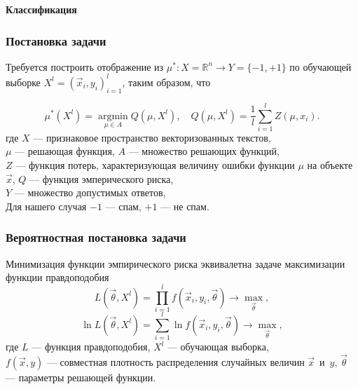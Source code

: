 \documentclass[compress,professionalfont]{beamer}
\begin{document}
\begin{frame}

\begin{center}
\Huge\bf Классификация
\end{center}

\end{frame}

\begin{frame}
\frametitle{Постановка задачи}

Требуется построить отображение из $\mu^{*} : X =  \mathbb{R}^n \rightarrow Y = \{-1,+1\}$ по обучающей выборке $X^l = (\vec{x}_i, y_i)_{i=1}^l$, таким образом, что

$$
\mu^{*}\left(X^l\right) = \operatorname*{argmin}_{\mu \in A}  Q\left(\mu, X^l\right), \quad Q\left(\mu, X^l\right) = \dfrac{1}{l} \sum_{i=1}^{l} Z(\mu, x_i).
$$
где $X$ --- признаковое пространство векторизованных текстов, \\
$\mu$ --- решающая функция, $A$ --- множество решающих функций, \\
$Z$ --- функция потерь, характеризующая величину ошибки функции $\mu$ на объекте $\vec{x}$, $Q$ --- функция эмперического риска, \\
$Y$ --- множество допустимых ответов, \\
Для нашего случая $-1$ --- спам, $+1$ --- не спам. \\

\end{frame}

\begin{frame}
\frametitle{Вероятностная постановка задачи}

Минимизация функции эмпирического риска эквивалетна задаче максимизации функции правдоподобия
$$
L(\vec{\theta}, X^l) = \prod\limits_{i=1}^l f(\vec{x}_i, y_i, \vec{\theta}) \rightarrow \max_{\vec{\theta}},
$$
$$
\ln L(\vec{\theta}, X^l) = \sum_{i=1}^{l} \ln f(\vec{x}_i, y_i, \vec{\theta}) \rightarrow \max_{\vec{\theta}},
$$
где $L$ --- функция правдоподобия, $X^l$ --- обучающая выборка, \\
$f(\vec{x}, y)$ --- совместная плотность распределения случайных величин $\vec{x}$~и~$y$,
$\vec{\theta}$ --- параметры решающей функции.

\end{frame}
\end{document}
